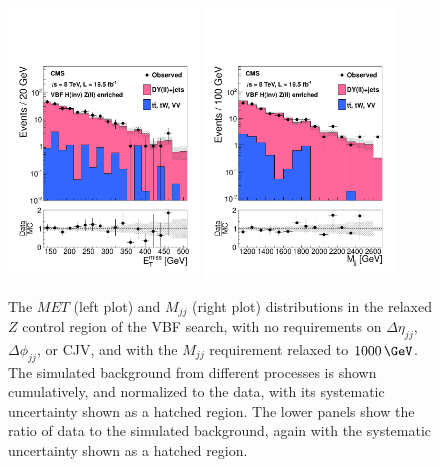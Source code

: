 \begin{figure}[!htb]
\centering
\includegraphics[width=0.45\textwidth]{Chapter05/Images/ZCtrlMET.pdf}
\includegraphics[width=0.45\textwidth]{Chapter05/Images/ZCtrlMjj.pdf}   
\caption{The $MET$ (left plot) and $M_{jj}$ (right plot) distributions in the relaxed $Z$ control region of the \gls{VBF} search, with no requirements on $\Delta\eta_{jj}$, $\Delta\phi_{jj}$, or \gls{CJV}, and with the $M_{jj}$ requirement relaxed to $1000\,\GeV$.  The simulated background from different processes is shown cumulatively, and normalized to the data, with its systematic uncertainty shown as a hatched region.  The lower panels show the ratio of data to the simulated background, again with the systematic uncertainty shown as a hatched region. \cite{ARTICLE:CMSVBFHiggsToInvAndZHCombination}}
\label{fig:zCtrl}
\end{figure}

